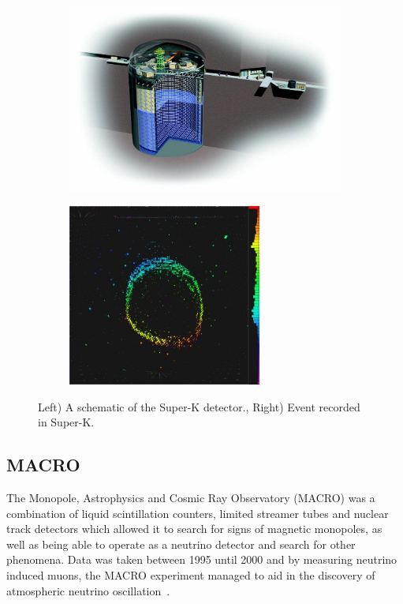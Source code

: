 \begin{figure}[h!]
\centering
\begin{subfigure}{.5\textwidth}
  \centering
\includegraphics[width=\textwidth]{figures/SK3D.jpg}
\vspace{2mm}
\end{subfigure}%
\begin{subfigure}{.5\textwidth}
  \centering
\includegraphics[width=0.7\textwidth]{figures/SuperKMuon-300x282.jpg}
\vspace{2mm}
\end{subfigure}
\vspace{2mm}
\caption{Left) A schematic of the Super-K detector., Right) Event recorded in Super-K.}
\label{fig:SK}
\end{figure}

\subsection{MACRO}
The Monopole, Astrophysics and Cosmic Ray Observatory (MACRO) was a combination of liquid scintillation counters, limited streamer tubes and nuclear track detectors which allowed it to search for signs of magnetic monopoles, as well as being able to operate as a neutrino detector and search for other phenomena. Data was taken between 1995 until 2000 and by measuring neutrino induced muons, the MACRO experiment managed to aid in the discovery of atmospheric neutrino oscillation~\cite{62MACRO}.


